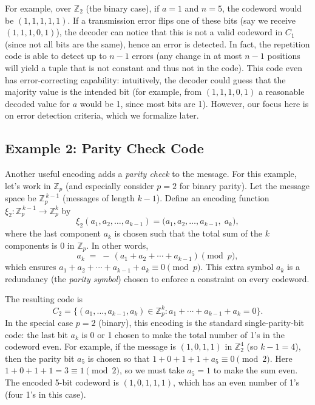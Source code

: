 \documentclass[docmute]{article}
\begin{document}
\medskip

For example, over $\mathbb{Z}_2$ (the binary case), if $a=1$ and $n=5$, the codeword would be $(1,1,1,1,1)$. If a transmission error flips one of these bits (say we receive $(1,1,1,0,1)$), the decoder can notice that this is not a valid codeword in $C_1$ (since not all bits are the same), hence an error is detected. In fact, the repetition code is able to detect up to $n-1$ errors (any change in at most $n-1$ positions will yield a tuple that is not constant and thus not in the code). This code even has error-correcting capability: intuitively, the decoder could guess that the majority value is the intended bit (for example, from $(1,1,1,0,1)$ a reasonable decoded value for $a$ would be 1, since most bits are 1). However, our focus here is on error detection criteria, which we formalize later.

\subsection*{Example 2: Parity Check Code}
Another useful encoding adds a \emph{parity check} to the message. For this example, let's work in $\mathbb{Z}_p$ (and especially consider $p=2$ for binary parity). Let the message space be $\mathbb{Z}_p^{\,k-1}$ (messages of length $k-1$). Define an encoding function $\xi_2: \mathbb{Z}_p^{\,k-1} \to \mathbb{Z}_p^k$ by 
\[ \xi_2(a_1, a_2, \ldots, a_{k-1}) = \big(a_1, a_2, \ldots, a_{k-1}, \; a_k\big), \] 
where the last component $a_k$ is chosen such that the total sum of the $k$ components is 0 in $\mathbb{Z}_p$. In other words,
\[ a_k \;=\; -\,(a_1 + a_2 + \cdots + a_{k-1}) \pmod{p}, \] 
which ensures $a_1 + a_2 + \cdots + a_{k-1} + a_k \equiv 0 \pmod{p}$. This extra symbol $a_k$ is a redundancy (the \emph{parity symbol}) chosen to enforce a constraint on every codeword.

The resulting code is 
\[ C_2 = \{(a_1,\ldots,a_{k-1},a_k) \in \mathbb{Z}_p^k : a_1 + \cdots + a_{k-1} + a_k = 0\}. \] 
In the special case $p=2$ (binary), this encoding is the standard single-parity-bit code: the last bit $a_k$ is 0 or 1 chosen to make the total number of 1's in the codeword even. For example, if the message is $(1,0,1,1)$ in $\mathbb{Z}_2^4$ (so $k-1=4$), then the parity bit $a_5$ is chosen so that $1+0+1+1+a_5 \equiv 0 \pmod{2}$. Here $1+0+1+1 = 3 \equiv 1 \pmod{2}$, so we must take $a_5 = 1$ to make the sum even. The encoded 5-bit codeword is $(1,0,1,1,1)$, which has an even number of 1's (four 1's in this case).
\end{document}
